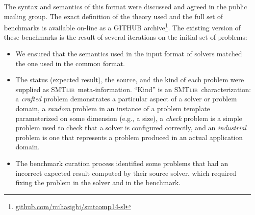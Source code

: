 \documentclass[twoside,11pt]{article}
\newcommand{\SLEEK}{\textsc{Sleek}}
\newcommand{\smtlib}{\textsc{SMTlib}}
\begin{document}
The syntax and semantics of this format were discussed and agreed in the public mailing group. 
The exact definition of the theory used and the full set of benchmarks is available on-line as a GITHUB archive\footnote{\url{github.com/mihasighi/smtcomp14-sl}}.
The existing version of these benchmarks is the result of several iterations on the initial set of problems:
\begin{itemize}
\item We ensured that the semantics used in the input format of solvers matched the one used in the common format. 
\item The status (expected result), the source, and the kind of each problem were supplied as \smtlib\ meta-information. ``Kind'' is an \smtlib\ characterization: a \textit{crafted} problem demonstrates a particular aspect of a solver or problem domain, a \textit{random} problem in an instance of a problem template parameterized on some dimension (e.g., a size), a \textit{check} problem is a simple problem used to check that a solver is configured correctly, and an \textit{industrial} problem is one that represents a problem produced in an actual application domain.
\item The benchmark curation process identified some problems that had an incorrect expected result computed by their source solver, which required fixing the problem in the solver and in the benchmark.
\end{itemize}
\end{document}
